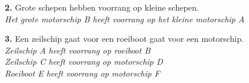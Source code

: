 \begin{figure}[H]
	\centering
	\begin{minipage}[t]{0.70\textwidth}
		\textbf{2.} Grote schepen hebben voorrang op kleine schepen.\\
		\textit{Het grote motorschip B heeft voorrang op het kleine motorschip A}
	\end{minipage}
	\hfill
	\begin{minipage}[t]{0.25\textwidth}
		\label{pic:tg2}
	\end{minipage}
	\hfill
\end{figure}
\vspace{-0.7cm}

\begin{figure}[H]
	\centering
	\begin{minipage}[t]{0.70\textwidth}
		\textbf{3.} Een zeilschip gaat voor een roeiboot gaat voor een motorschip.\\
		\textit{Zeilschip A heeft voorrang op roeiboot B \\
			Zeilschip C heeft voorrang op motorschip D \\
			Roeiboot E heeft voorrang op motorschip F}
	\end{minipage}
	\hfill
	\begin{minipage}[t]{0.25\textwidth}
		\label{pic:tg3a}
	\end{minipage}
	\hfill
\end{figure}
\vspace{-0.7cm}


